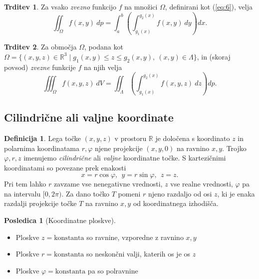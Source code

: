 \documentclass[11pt]{article}
\theoremstyle{definition}
\newtheorem{definicija}{Definicija}[section]
\theoremstyle{definition}
\newtheorem{trditev}{Trditev}[section]
\theoremstyle{definition}
\newtheorem*{posledica}{Posledica}
\begin{document}
\begin{trditev}

Za vsako \textit{zvezno} funkcijo $f$ na množici $\Omega$, definirani kot (\ref{eq:6}), velja
$$\iint_\Omega f(x, y) ~dp = \int_a^b \left( \int_{g_1(x)}^{g_2(x)} f(x, y) ~dy \right) dx.$$

\end{trditev}
\vspace{0.5cm}

\begin{trditev}

Za območja $\Omega$, podana kot \\$\Omega = \{ (x, y, z) \in \mathbb{R}^3 \mid g_1(x, y) \leq z \leq g_2(x, y), ~(x, y) \in \Lambda \}$, in (skoraj povsod) \textit{zvezne} funkcije $f$ na njih velja
$$\iiint_\Omega f(x, y, z) ~dV = \iint_\Lambda \left( \int_{g_1(x)}^{g_2(x)} f(x, y, z) ~dz \right) dp.$$

\end{trditev}
\vspace{0.5cm}


\subsection{Cilindrične ali valjne koordinate}
\vspace{0.5cm}

\begin{definicija}

Lega točke $(x, y, z)$ v prostoru $\mathbb{R}$ je določena s koordinato $z$ in polarnima koordinatama $r, \varphi$ njene projekcije $(x, y, 0)$ na ravnino $x,y$. Trojko $\varphi, r, z$ imenujemo \textit{cilindrične} ali \textit{valjne} koordinatne točke. S kartezičnimi koordinatami so povezane prek enakosti
$$x = r \cos{\varphi}, ~~y = r \sin{\varphi}, ~~z = z.$$
Pri tem lahko $r$ zavzame vse nenegativne vrednosti, $z$ vse realne vrednosti, $\varphi$ pa na intervalu $[0, 2\pi)$. Za dano točko $T$ pomeni $r$ njeno razdaljo od osi $z$, ki je enaka razdalji projekcije točke $T$ na ravnino $x,y$ od koordinatnega izhodišča.

\end{definicija}
\vspace{0.5cm}

\begin{posledica}[Koordinatne ploskve]
~\\
\begin{itemize}
	\item Ploskve $z = \text{konstanta}$ so ravnine, vzporedne z ravnino $x,y$
	\item Ploskve $r = \text{konstanta}$ so neskončni valji, katerih os je os $z$
	\item Ploskve $\varphi = \text{konstanta}$ pa so polravnine
\end{itemize}

\end{posledica}
\vspace{0.5cm}
\end{document}
